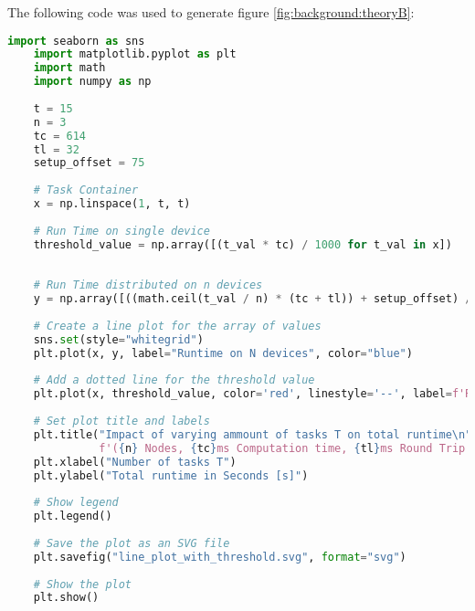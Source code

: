 The following code was used to generate figure \ref{fig:background:theoryB}:
\begin{lstlisting}[language=Python, frame=tb, caption={Ploting execution time (variable tasks)}]
    import seaborn as sns
    import matplotlib.pyplot as plt
    import math
    import numpy as np
    
    t = 15
    n = 3
    tc = 614
    tl = 32
    setup_offset = 75
    
    # Task Container
    x = np.linspace(1, t, t)
    
    # Run Time on single device
    threshold_value = np.array([(t_val * tc) / 1000 for t_val in x])
    
    
    # Run Time distributed on n devices
    y = np.array([((math.ceil(t_val / n) * (tc + tl)) + setup_offset) / 1000 for t_val in x])
    
    # Create a line plot for the array of values
    sns.set(style="whitegrid")
    plt.plot(x, y, label="Runtime on N devices", color="blue")
    
    # Add a dotted line for the threshold value
    plt.plot(x, threshold_value, color='red', linestyle='--', label=f'Runtime on single device')
    
    # Set plot title and labels
    plt.title("Impact of varying ammount of tasks T on total runtime\n"
              f'({n} Nodes, {tc}ms Computation time, {tl}ms Round Trip Time, {setup_offset}ms Offset)')
    plt.xlabel("Number of tasks T")
    plt.ylabel("Total runtime in Seconds [s]")
    
    # Show legend
    plt.legend()
    
    # Save the plot as an SVG file
    plt.savefig("line_plot_with_threshold.svg", format="svg")
    
    # Show the plot
    plt.show()
\end{lstlisting}